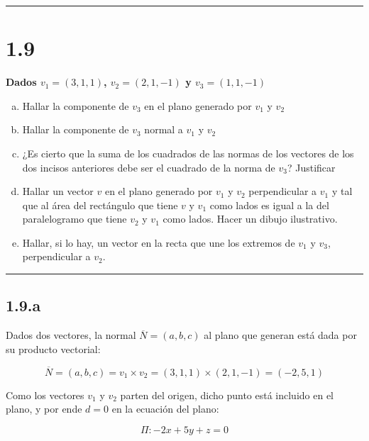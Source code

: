 \documentclass{article}
\begin{document}
\hrule
\vspace{10 pt}

\section*{1.9}
\label{sec:1.9}

\textbf{Dados $v_1 = (3, 1, 1)$, $v_2 = (2, 1, -1)$ y $v_3 = (1, 1, -1)$}

\begin{enumerate}[(a)]
\bfseries
\item Hallar la componente de $v_3$ en el plano generado por $v_1$ y $v_2$

\item Hallar la componente de $v_3$ normal a $v_1$ y $v_2$

\item ¿Es cierto que la suma de los cuadrados de las normas de los vectores de los dos incisos anteriores debe ser el cuadrado de la norma de $v_3$? Justificar

\item Hallar un vector $v$ en el plano generado por $v_1$ y $v_2$ perpendicular a $v_1$ y tal que al área del rectángulo que tiene $v$ y $v_1$ como lados es igual a la del paralelogramo que tiene $v_2$ y $v_1$ como lados. Hacer un dibujo ilustrativo.

\item Hallar, si lo hay, un vector en la recta que une los extremos de $v_1$ y $v_3$, perpendicular a $v_2$. 
\end{enumerate}
\hrule

\subsection*{1.9.a}
\label{subsec:1.9.a}

Dados dos vectores, la normal $\overline{N} = (a, b, c)$ al plano que generan está dada por su producto vectorial:

\begin{equation}
\overline{N} = (a, b, c) = v_1 \times v_2 = (3, 1, 1) \times (2, 1, -1) = (-2, 5, 1)
\end{equation}

Como los vectores $v_1$ y $v_2$ parten del origen, dicho punto está incluido en el plano, y por ende $d = 0$ en la ecuación del plano:

\begin{equation}
\Pi: -2x + 5y + z = 0
\end{equation}
\end{document}
